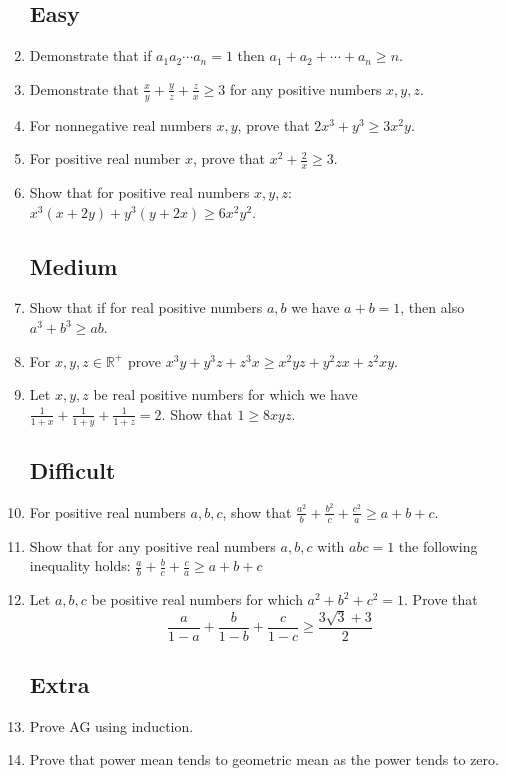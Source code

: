 \documentclass[11pt,a5paper]{article}
\begin{document}
\begin{enumerate}
	\subsection*{Easy}
	\item{Demonstrate that if $a_1a_2\cdots a_n=1$ then 
	$a_1+a_2+\cdots +a_n\ge n$.}

	\item{Demonstrate that $\frac{x}{y} + \frac{y}{z} + \frac{z}{x} \ge 3$  for any positive numbers $x, y, z$.}

	\item{For nonnegative real numbers $x, y$, prove that $2x^3 + y^3 \ge 3x^2y$.}
	\item{For positive real number $x$, prove that $x^2 + \frac{2}{x} \ge 3$.}

	\item{Show that for positive real numbers $x, y, z$: \\ $x^3(x + 2y) + y^3(y + 2x) \ge 6x^2y^2$.}
	\subsection*{Medium}	
	\item{Show that if for real positive numbers $a, b$ we have $a + b = 1$, then also $a^3 + b^3 \ge ab$.}

	\item{For $x, y, z \in \mathbb{R}^{+}$ prove $x^3y + y^3z + z^3x \ge x^2yz + y^2zx + z^2xy$.}
	
	\item{Let $x, y, z$ be real positive numbers for which we have \\ $\frac{1}{1 + x} + \frac{1}{1 + y} + \frac{1}{1+z} = 2$. Show that $1 \ge 8xyz$.}
	
	\subsection*{Difficult}
	\item{For positive real numbers $a, b, c$, show that $\frac{a^2}{b} + \frac{b^2}{c} + \frac{c^2}{a} \ge a + b + c$.}

	\item{Show that for any positive real numbers $a, b, c$ with $abc = 1$ 	 the following inequality holds: 
	$\frac{a}{b} + \frac{b}{c} + \frac{c}{a} \ge a + b + c$}

	\item{Let $a, b, c$ be positive real numbers for which $a^2 + b^2 + c^2 = 1$. Prove that \\
	\[\frac{a}{1-a} + \frac{b}{1 - b} + \frac{c}{1 - c} \ge \frac{3\sqrt{3} + 3}{2}\]}

	\subsection*{Extra}	
	\item{Prove AG using induction.}
	
	\item{Prove that power mean tends to geometric mean as the power 
	tends to zero.}
\end{enumerate}
\end{document}
